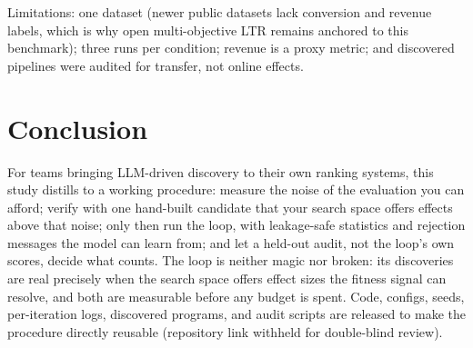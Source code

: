 \documentclass[]{ceurart}
\begin{document}
Limitations: one dataset (newer public datasets lack conversion and
revenue labels, which is why open multi-objective LTR remains anchored to
this benchmark); three runs per condition; revenue is a proxy metric; and
discovered pipelines were audited for transfer, not online effects.

\section{Conclusion}
For teams bringing LLM-driven discovery to their own ranking systems, this
study distills to a working procedure: measure the noise of the evaluation
you can afford; verify with one hand-built candidate that your search space
offers effects above that noise; only then run the loop, with leakage-safe
statistics and rejection messages the model can learn from; and let a
held-out audit, not the loop's own scores, decide what counts. The loop is neither magic nor broken: its discoveries are real precisely
when the search space offers effect sizes the fitness signal can resolve,
and both are measurable before any budget is spent. Code, configs, seeds,
per-iteration logs, discovered programs, and audit scripts are released to
make the procedure directly reusable (repository link withheld for
double-blind review).
\end{document}
